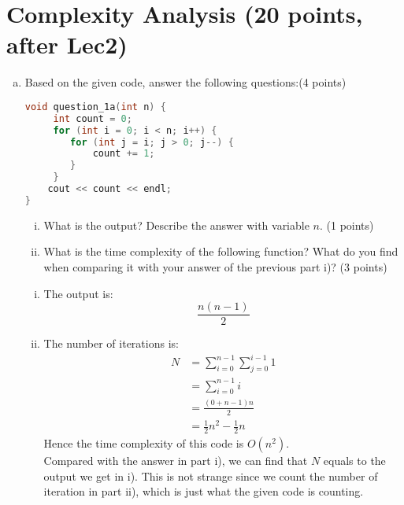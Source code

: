 \documentclass[11pt]{exam}
\begin{document}
\section{Complexity Analysis (20 points, after Lec2)}

\begin{enumerate}[(a)]

\item Based on the given code, answer the following questions:(4 points)
\begin{lstlisting}[language=c++]
void question_1a(int n) {
	 int count = 0;
	 for (int i = 0; i < n; i++) {
	 	for (int j = i; j > 0; j--) {
	 		count += 1;
	 	}
	 }
	cout << count << endl;
}
\end{lstlisting}
\begin{enumerate}[i)]
\item What is the output? Describe the answer with variable $n$. (1 points)
\item What is the time complexity of the following function? What do you find when comparing it with your answer of the previous part i)? (3 points)
\end{enumerate}

\begin{solution}
\begin{enumerate}[i)]
    \item The output is: 
    \begin{equation*}
        \frac{n(n-1)}{2}
    \end{equation*}
    \item The number of iterations is:
    \begin{equation*}
        \begin{aligned}
        N &=\sum_{i=0}^{n-1} \sum_{j=0}^{i-1} 1 \\
        &=\sum_{i=0}^{n-1} i \\
        &=\frac{(0+n-1) n}{2} \\
        &=\frac{1}{2} n^{2}-\frac{1}{2} n
        \end{aligned}
    \end{equation*}
    Hence the time complexity of this code is $O(n^{2})$. \\
    Compared with the answer in part i), we can find that $N$ equals to the output we get in i). This is not strange since we count the number of iteration in part ii), which is just what the given code is counting.
\end{enumerate}


\end{solution}
\end{enumerate}
\end{document}
